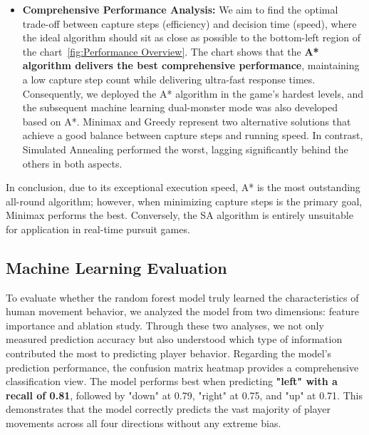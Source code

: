 \documentclass[12pt,a4paper]{article}
\begin{document}
\begin{itemize}
Considering that our game is a real-time interactive system, the AI must not only possess strong pursuit capabilities but also guarantee sufficient response speed. \textbf{A* achieved the fastest decision speed, requiring an average of only 0.0511 milliseconds} per decision. From an operational efficiency standpoint, it is the most outstanding among the four algorithms. Greedy's average decision time was 0.3449 milliseconds; although slightly slower than A*, it remains highly efficient. Minimax recorded an average decision time of 0.6211 milliseconds. Compared to A* and Greedy, its execution speed is slower, but the reason is evident: Minimax needs to search future possible game states before making a decision. SA performed poorly, with an average decision time as high as 9.9962 milliseconds, far exceeding the other three algorithms.
    
    \item \textbf{Comprehensive Performance Analysis:} We aim to find the optimal trade-off between capture steps (efficiency) and decision time (speed), where the ideal algorithm should sit as close as possible to the bottom-left region of the chart~\ref{fig:Performance Overview}. The chart shows that the \textbf{A* algorithm delivers the best comprehensive performance}, maintaining a low capture step count while delivering ultra-fast response times. Consequently, we deployed the A* algorithm in the game's hardest levels, and the subsequent machine learning dual-monster mode was also developed based on A*. Minimax and Greedy represent two alternative solutions that achieve a good balance between capture steps and running speed. In contrast, Simulated Annealing performed the worst, lagging significantly behind the others in both aspects.
\end{itemize}

In conclusion, due to its exceptional execution speed, A* is the most outstanding all-round algorithm; however, when minimizing capture steps is the primary goal, Minimax performs the best. Conversely, the SA algorithm is entirely unsuitable for application in real-time pursuit games.


\subsection{Machine Learning Evaluation}

To evaluate whether the random forest model truly learned the characteristics of human movement behavior, we analyzed the model from two dimensions: feature importance and ablation study. Through these two analyses, we not only measured prediction accuracy but also understood which type of information contributed the most to predicting player behavior. Regarding the model's prediction performance, the confusion matrix heatmap provides a comprehensive classification view. The model performs best when predicting \textbf{"left" with a recall of 0.81}, followed by "down" at 0.79, "right" at 0.75, and "up" at 0.71. This demonstrates that the model correctly predicts the vast majority of player movements across all four directions without any extreme bias.
\end{document}
